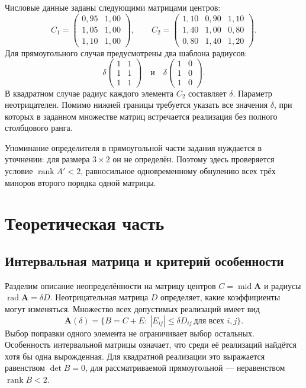 \documentclass[12pt,a4paper]{article}
\newcommand{\Mid}{\operatorname{mid}}
\newcommand{\Rad}{\operatorname{rad}}
\newcommand{\rank}{\operatorname{rank}}
\begin{document}
Числовые данные заданы следующими матрицами центров:
\[
C_1=
\begin{pmatrix}
0{,}95&1{,}00\\
1{,}05&1{,}00\\
1{,}10&1{,}00
\end{pmatrix},
\qquad
C_2=
\begin{pmatrix}
1{,}10&0{,}90&1{,}10\\
1{,}40&1{,}00&0{,}80\\
0{,}80&1{,}40&1{,}20
\end{pmatrix}.
\]
Для прямоугольного случая предусмотрены два шаблона радиусов:
\[
\delta
\begin{pmatrix}1&1\\1&1\\1&1\end{pmatrix}
\quad\text{и}\quad
\delta
\begin{pmatrix}1&0\\1&0\\1&0\end{pmatrix}.
\]
В квадратном случае радиус каждого элемента $C_2$ составляет $\delta$.
Параметр неотрицателен. Помимо нижней границы требуется указать все
значения $\delta$, при которых в заданном множестве матриц встречается
реализация без полного столбцового ранга.

Упоминание определителя в прямоугольной части задания нуждается
в уточнении: для размера $3\times2$ он не определён. Поэтому здесь
проверяется условие $\rank A'<2$, равносильное одновременному
обнулению всех трёх миноров второго порядка одной матрицы.

\section{Теоретическая часть}

\subsection{Интервальная матрица и критерий особенности}

Разделим описание неопределённости на матрицу центров
$C=\Mid\boldsymbol A$ и радиусы $\Rad\boldsymbol A=\delta D$.
Неотрицательная матрица $D$ определяет, какие коэффициенты могут
изменяться. Множество всех допустимых реализаций имеет вид
\begin{equation}
\boldsymbol A(\delta)=
\bigl\{B=C+E:\ |E_{ij}|\leq\delta D_{ij}\ \text{для всех }i,j\bigr\}.
\label{eq:interval-matrix}
\end{equation}
Выбор поправки одного элемента не ограничивает выбор остальных.
Особенность интервальной матрицы означает, что среди её реализаций
найдётся хотя бы одна вырожденная. Для квадратной реализации это
выражается равенством $\det B=0$, для рассматриваемой прямоугольной
--- неравенством $\rank B<2$.
\end{document}
